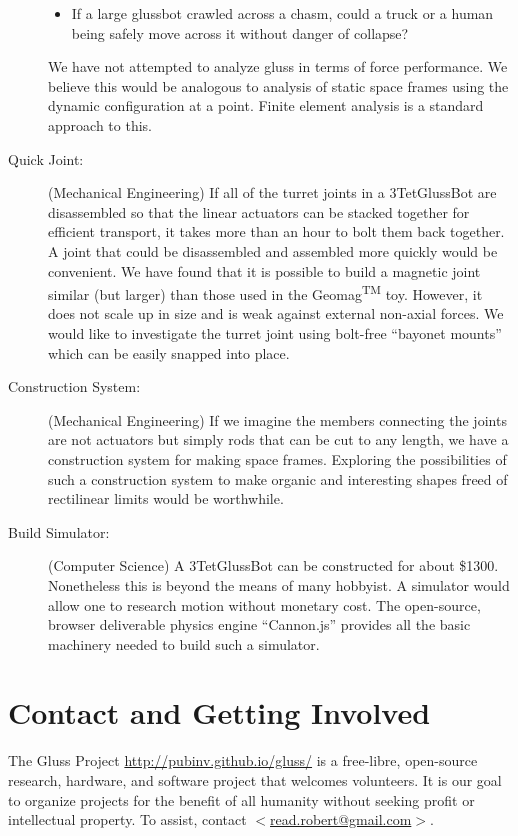 \documentclass[11pt]{article}
\begin{document}
\begin{description}
\begin{itemize}
\item If a large glussbot crawled across a chasm, could a truck or a human being safely move
  across it without danger of collapse?
\end{itemize}
We have not attempted to analyze gluss in terms of force performance. We believe this would
be analogous to analysis of static space frames using the dynamic configuration at a point.
Finite element analysis is a standard approach to this.
\item [Quick Joint:] (Mechanical Engineering) If all of the turret joints in a 3TetGlussBot are disassembled so that
  the linear actuators can be stacked together for efficient transport, it takes more than an hour
  to bolt them back together.
    A joint that could be
  disassembled and assembled more quickly would be convenient.
We have found that it is possible to build a magnetic
  joint similar (but larger) than those used in the Geomag\textsuperscript{TM} toy. However, it does not scale up in size
  and is weak against external non-axial forces. We would like to investigate the turret joint using bolt-free ``bayonet mounts'' which
  can be easily snapped into place.
\item [Construction System:] (Mechanical Engineering) If we imagine the members connecting the joints are not actuators but
  simply rods that can be cut to any length, we have a construction system for making space frames.
  Exploring the possibilities of such a construction system to make organic and interesting shapes
  freed of rectilinear limits would be worthwhile.
\item [Build Simulator:] (Computer Science) A 3TetGlussBot can be constructed for about \$1300. Nonetheless this
  is beyond the means of many hobbyist. A simulator would allow one to research 
  motion without monetary cost. The open-source, browser deliverable physics engine ``Cannon.js''
  provides all the basic machinery needed to build such a simulator.
\end{description}


\section{Contact and Getting Involved}

The Gluss Project \url{http://pubinv.github.io/gluss/}
is a free-libre, open-source research, hardware, and software project that welcomes volunteers.
It is our goal to organize projects for the benefit of all humanity without seeking profit or intellectual property.
To assist, contact \href{mailto:read.robert@gmail.com}{$<$read.robert@gmail.com$>$}.
\end{document}
